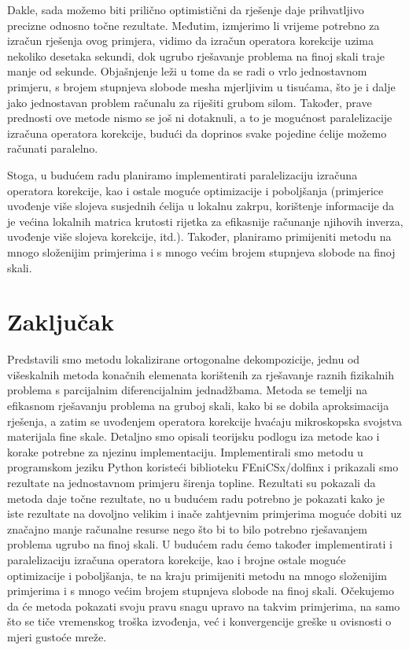 \documentclass[zavrsnirad]{fer}
\begin{document}
Dakle, sada možemo biti prilično optimistični da rješenje daje prihvatljivo precizne odnosno točne rezultate.
Međutim, izmjerimo li vrijeme potrebno za izračun rješenja ovog primjera, vidimo da izračun operatora korekcije
uzima nekoliko desetaka sekundi, dok ugrubo rješavanje problema na finoj skali traje manje od sekunde.
Objašnjenje leži u tome da se radi o vrlo jednostavnom primjeru, s brojem stupnjeva slobode mesha mjerljivim u tisućama,
što je i dalje jako jednostavan problem računalu za riješiti grubom silom. Također, prave prednosti ove metode nismo se još
ni dotaknuli, a to je mogućnost paralelizacije izračuna operatora korekcije, budući da doprinos
svake pojedine ćelije možemo računati paralelno.

Stoga, u budućem radu planiramo implementirati paralelizaciju izračuna operatora korekcije,
kao i ostale moguće optimizacije i poboljšanja (primjerice uvođenje više slojeva susjednih ćelija u lokalnu zakrpu,
korištenje informacije da je većina lokalnih matrica krutosti rijetka za efikasnije računanje njihovih inverza,
uvođenje više slojeva korekcije, itd.). Također, planiramo primijeniti metodu na mnogo složenijim primjerima i
s mnogo većim brojem stupnjeva slobode na finoj skali.



\chapter{Zaključak}
\label{pog:zakljucak}

Predstavili smo metodu lokalizirane ortogonalne dekompozicije, jednu od višeskalnih metoda konačnih elemenata
korištenih za rješavanje raznih fizikalnih problema s parcijalnim diferencijalnim jednadžbama. Metoda se temelji na efikasnom rješavanju problema na gruboj skali,
kako bi se dobila aproksimacija rješenja, a zatim se uvođenjem operatora korekcije hvaćaju mikroskopska svojstva materijala fine skale.
Detaljno smo opisali teorijsku podlogu iza metode kao i korake potrebne za njezinu implementaciju.
Implementirali smo metodu u programskom jeziku Python koristeći biblioteku FEniCSx/dolfinx
i prikazali smo rezultate na jednostavnom primjeru širenja topline. Rezultati su pokazali da metoda daje točne rezultate,
no u budućem radu potrebno je pokazati kako je iste rezultate na dovoljno velikim i inače zahtjevnim primjerima
moguće dobiti uz značajno manje računalne resurse nego što bi to bilo potrebno rješavanjem problema ugrubo na finoj skali.
U budućem radu ćemo također implementirati i paralelizaciju izračuna operatora korekcije, kao i brojne ostale moguće optimizacije i poboljšanja,
te na kraju primijeniti metodu na mnogo složenijim primjerima i s mnogo većim brojem stupnjeva slobode na finoj skali.
Očekujemo da će metoda pokazati svoju pravu snagu upravo na takvim primjerima, na samo što se tiče vremenskog troška izvođenja,
već i konvergencije greške u ovisnosti o mjeri gustoće mreže.
\end{document}
